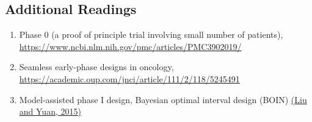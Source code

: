\documentclass[
]{article}
\providecommand{\tightlist}{%
  \setlength{\itemsep}{0pt}\setlength{\parskip}{0pt}}
\begin{document}
\hypertarget{additional-readings}{%
\subsection{Additional Readings}\label{additional-readings}}

\begin{enumerate}
\def\labelenumi{\arabic{enumi}.}
\tightlist
\item
  Phase 0 (a proof of principle trial involving small number of
  patients), \url{https://www.ncbi.nlm.nih.gov/pmc/articles/PMC3902019/}
\item
  Seamless early-phase designs in oncology,
  \url{https://academic.oup.com/jnci/article/111/2/118/5245491}
\item
  Model-assisted phase I design, Bayesian optimal interval design (BOIN)
  \href{https://doi.org/10.1111/rssc.12089}{(Liu and Yuan, 2015)}
\end{enumerate}
\end{document}
